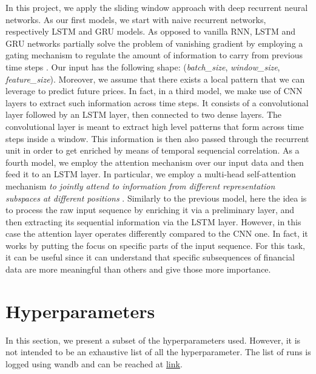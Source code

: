 \documentclass{article}
\begin{document}
In this project, we apply the sliding window approach with deep recurrent neural networks. As our first models, we start with naive recurrent networks, respectively LSTM and GRU models. As opposed to vanilla RNN, LSTM and GRU networks partially solve the problem of vanishing gradient by employing a gating mechanism to regulate the amount of information to carry from previous time steps \cite{vanishing}. Our input has the following shape: (\emph{batch\_size}, \emph{window\_size}, \emph{feature\_size}). Moreover, we assume that there exists a local pattern that we can leverage to predict future prices.
In fact, in a third model, we make use of CNN layers to extract such information across
time steps. It consists of a convolutional layer followed by an LSTM layer, then connected
to two dense layers. The convolutional layer is meant to extract high level patterns that
form across time steps inside a window. This information is then also passed through the
recurrent unit in order to get enriched by means of temporal sequencial correlation.
As a fourth model, we employ the attention mechanism over our input
data and then feed it to an LSTM layer. In particular, we employ a multi-head
self-attention mechanism \emph{to jointly attend to information from different
representation subspaces at different positions} \cite{46201}. Similarly to the previous
model, here the idea is to process the raw input sequence by enriching it via a preliminary
layer, and then extracting its sequential information via the LSTM layer. However, in this
case the attention layer operates differently compared to the CNN one. In fact, it works
by putting the focus on specific parts of the input sequence. For this task, it can be useful
since it can understand that specific subsequences of financial data are more meaningful than
others and give those more importance.    

\section{Hyperparameters}

In this section, we present a subset of the hyperparameters used. However, it is not intended to be an exhaustive list of all the hyperparameter. The list of runs is logged using wandb \cite{wandb} and can be reached at \href{https://wandb.ai/leonardoemili/spf?workspace=user-leonardoemili}{link}.
\end{document}
